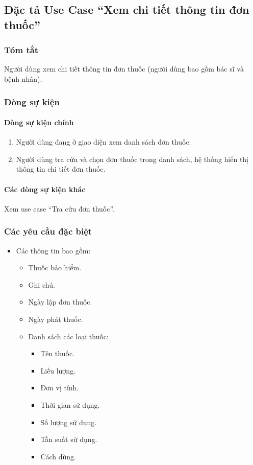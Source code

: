 \subsection{Đặc tả Use Case ``Xem chi tiết thông tin đơn thuốc''}

\subsubsection{Tóm tắt}
Người dùng xem chi tiết thông tin đơn thuốc (người dùng bao gồm bác sĩ và bệnh nhân).

\subsubsection{Dòng sự kiện}
\paragraph{\textbf{Dòng sự kiện chính}}
\begin{enumerate}
  \item Người dùng đang ở giao diện xem danh sách đơn thuốc.
  \item Người dùng tra cứu và chọn đơn thuốc trong danh sách, hệ thống hiển thị thông tin chi tiết đơn thuốc.
\end{enumerate}

\paragraph{\textbf{Các dòng sự kiện khác}}
Xem use case ``Tra cứu đơn thuốc''.

\subsubsection{Các yêu cầu đặc biệt}
\begin{itemize}
  \item Các thông tin bao gồm:
    \begin{itemize}
      \item Thuốc bảo hiểm.
      \item Ghi chú.
      \item Ngày lập đơn thuốc.
      \item Ngày phát thuốc.
      \item Danh sách các loại thuốc:
      \begin{itemize}
        \item Tên thuốc.
        \item Liều lượng.
        \item Đơn vị tính.
        \item Thời gian sử dụng.
        \item Số lượng sử dụng.
        \item Tần suất sử dụng.
        \item Cách dùng.
      \end{itemize}
    \end{itemize}
\end{itemize}

